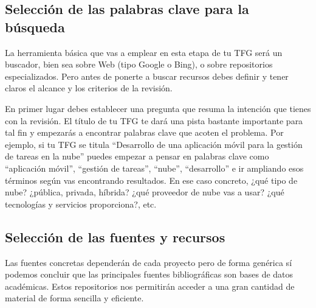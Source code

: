 \subsection{Selección de las palabras clave para la búsqueda}

La herramienta básica que vas a emplear en esta etapa de tu TFG será un buscador, bien sea sobre Web (tipo Google o Bing), o sobre repositorios especializados. Pero antes de ponerte a buscar recursos debes definir y tener claros el alcance y los criterios de la revisión. 

En primer lugar debes establecer una pregunta que resuma la intención que tienes con la revisión. El título de tu TFG te dará una pista bastante importante para tal fin y empezarás a encontrar palabras clave que acoten el problema. Por ejemplo, si tu TFG se titula ``Desarrollo de una aplicación móvil para la gestión de tareas en la nube'' puedes empezar a pensar en palabras clave como ``aplicación móvil'', ``gestión de tareas'', ``nube'', ``desarrollo'' e ir ampliando esos términos según vas encontrando resultados. En ese caso concreto, ¿qué tipo de nube? ¿pública, privada, híbrida? ¿qué proveedor de nube vas a usar? ¿qué tecnologías y servicios proporciona?, etc.


\subsection{Selección de las fuentes y recursos}

Las fuentes concretas dependerán de cada proyecto pero de forma genérica sí podemos concluir que las principales fuentes bibliográficas son bases de datos académicas. Estos repositorios nos permitirán acceder a una gran cantidad de material de forma sencilla y eficiente. 

